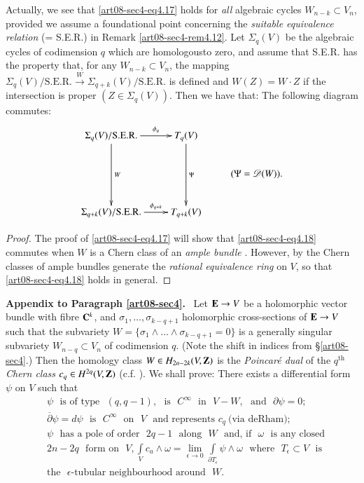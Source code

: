 \begin{remark*}
Actually, we see that \eqref{art08-sec4-eq4.17} holds for {\em all} algebraic cycles $W_{n-k}\subset V_{n}$, provided we assume a foundational point concerning the {\em suitable equivalence relation} (= S.E.R.) in Remark \ref{art08-sec4-rem4.12}. Let $\Sigma_{q}(V)$ be the algebraic cycles of codimension $q$ which are homologous\pageoriginale to zero, and assume that S.E.R. has the property that, for any $W_{n-k}\subset V_{n}$, the mapping $\Sigma_{q}(V)/\text{S.E.R.}\xrightarrow{W}\Sigma_{q+k}(V)/\text{S.E.R.}$ is defined and $W(Z)=W\cdot Z$ if the intersection is proper $(Z\in \Sigma_{q}(V))$. Then we have that: The following diagram commutes:
\begin{equation}
\vcenter{\xymatrix{
\Sigma_{q}(V)/\text{S.E.R.}\ar[dd]^-{W}\ar[r]^-{\phi_{q}} & T_{q}(V)\ar[dd]^-{\Psi} &\\
 & & (\Psi=\mathscr{D}(W)).\\
\Sigma_{q+k}(V)/\text{S.E.R.}\ar[r]^-{\phi_{q+k}} & T_{q+k}(V) &
}}\label{art08-sec4-eq4.18}
\end{equation}
\end{remark*}

\begin{proof}
The proof of \eqref{art08-sec4-eq4.17} will show that \eqref{art08-sec4-eq4.18} commutes when $W$ is a Chern class of an {\em ample bundle} \cite{art08-key11}. However, by \cite{art08-key12} the Chern classes of ample bundles generate the {\em rational equivalence ring} on $V$, so that \eqref{art08-sec4-eq4.18} holds in general.
\end{proof}

\medskip
\noindent
{\bf Appendix to Paragraph \ref{art08-sec4}.}~ Let $\mathbf{E}\to V$ be a holomorphic vector bundle with fibre $\mathbf{C}^{k}$, and $\sigma_{1},\ldots,\sigma_{k-q+1}$ holomorphic cross-sections of $\mathbf{E}\to V$ such that the subvariety $W=\{\sigma_{1}\wedge\ldots\wedge \sigma_{k-q+1}=0\}$ is a generally singular subvariety $W_{n-q}\subset V_{n}$ of codimension $q$. (Note the shift in indices from \S\ref{art08-sec4}.) Then the homology class $W\in H_{2n-2k}(V,\mathbf{Z})$ is the {\em Poincar\'e dual} of the $q^{\text{th}}$ {\em Chern class} $c_{q}\in H^{2q}(V,\mathbf{Z})$ (c.f. \cite{art08-key11}). We shall prove: There exists a differential form $\psi$ on $V$ such that
\begin{align*}
& \psi \text{~ is of type~ }(q,q-1), \text{~ is~ } C^{\infty}\text{~ in~ } V-W,\text{~ and~ } \partial \psi=0;\tag{A4.1}\label{art08-sec4-eqA4.1}\\
& \overline{\partial}\psi =d\psi \text{~ is~ } C^{\infty}\text{~ on~ } V\text{~ and represents~} c_{q}~\text{(via deRham)};\tag{A4.2}\label{art08-sec4-eqA4.2}\\
& \psi \text{~ has a pole of order~ } 2q-1\text{~ along~ } W \text{~ and, if~ }\omega \text{~ is any closed}\\
& 2n-2q\text{~ form on~ } V,\int\limits_{V}c_{a}\wedge\omega=\lim\limits_{\epsilon\to 0}\int\limits_{\partial T_{\epsilon}}\psi\wedge \omega\text{~ where~ } T_{\epsilon}\subset V\text{~ is}\\
& \text{the~ }\epsilon\text{-tubular neighbourhood around~ } W.\tag{A4.3}\label{art08-sec4-eqA4.3}
\end{align*}

